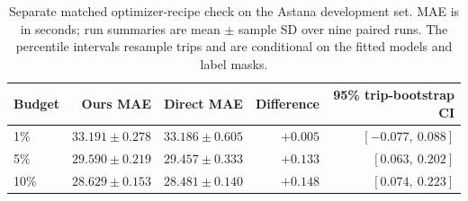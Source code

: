 \begin{table}[t]
\centering\small\setlength{\tabcolsep}{6pt}
\caption{Separate matched optimizer-recipe check on the Astana development set. MAE is in seconds; run summaries are mean $\pm$ sample SD over nine paired runs. The percentile intervals resample trips and are conditional on the fitted models and label masks.}\label{tab:performance-confirmation}
\begin{tabular}{lrrrr}\toprule
Budget & Ours MAE & Direct MAE & Difference & 95\% trip-bootstrap CI\\\midrule
1\% & $33.191\pm0.278$ & $33.186\pm0.605$ & $+0.005$ & $[-0.077,\ 0.088]$\\
5\% & $29.590\pm0.219$ & $29.457\pm0.333$ & $+0.133$ & $[0.063,\ 0.202]$\\
10\% & $28.629\pm0.153$ & $28.481\pm0.140$ & $+0.148$ & $[0.074,\ 0.223]$\\
\bottomrule\end{tabular}
\end{table}
